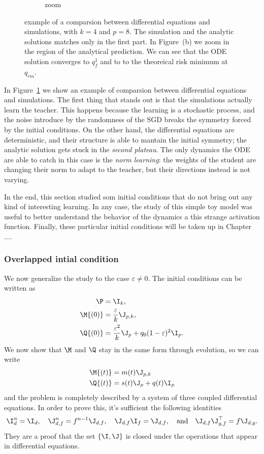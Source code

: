 \begin{figure}
\begin{subfigure}{0.495\textwidth}
    \caption{zoom}
  \end{subfigure}
  \caption{
    example of a comparsion between differential equations and simulations, with \(k=4\) and \(p=8\).
    The simulation and the analytic solutions matches only in the first part.
    In Figure~(b) we zoom in the region of the analytical prediction. We can see
    that the ODE solution converges to \(q_f^1\) and to to the theoreical risk minimum at \(q_{rm}\).
  }
  \label{fig:example-eps0}
\end{figure}
In Figure~\ref{fig:example-eps0} we show an example of comparsion between differential equations and simulations.
The first thing that stands out is that the simulations actually learn the teacher.
This happens because the learning is a stochastic process, and the noise introduce
by the randomness of the SGD breaks the symmetry forced by the initial conditions.
On the other hand, the differential equations are deterministic, and their structure
is able to mantain the initial symmetry; the analytic solution gets stuck in the 
\emph{second plateau}. The only dynamics the ODE are able to catch in this case is 
the \emph{norm learning}: the weights of the student are changing their norm to adapt 
to the teacher, but their directions instead is not varying.

In the end, this section studied som initial conditions that do not bring out any kind of interesting learning.
In any case, the study of this simple toy model was useful to better understand the behavior of the dynamics a this strange activation function.
Finally, these particular initial conditions will be taken up in Chapter ....

\subsubsection{Overlapped intial condition}
We now generalize the study to the case \(\varepsilon\neq0\).
The initial conditions can be written as
\[\begin{split}
    \P &= \I_k,\\
    \M{(0)} &= \frac{\varepsilon}{k}\J_{p,k},\\
    \Q{(0)} &= \frac{\varepsilon^2}{k}\J_{p} + q_0(1-\varepsilon)^2\I_{p}.\\
\end{split}\]
We now show that \(\M\) and \(\Q\) stay in the same form through evolution, so we can write
\[\begin{split}
    \M{(t)} &= m{(t)} \J_{p,k} \\
    \Q{(t)} &= s{(t)} \J_{p} + q{(t)}\I_{p} \\
\end{split}\]
and the problem is completely described by a system of three coupled differential equations.
In order to prove this, it's sufficient the following identities
\[
    \I_d^n=\I_d, \quad \J_{d,f}^n = f^{n-1}\J_{d,f}, \quad \J_{d,f}\I_f = \J_{d,f}, \quad\text{and}\quad
    \J_{d,f} \J_{g,f}^\top = f \J_{d,g}.
\]
They are a proof that the set \(\{\I,\J\}\) is closed under the operations that appear in differential equations.

